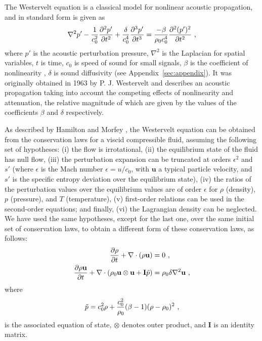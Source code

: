 The Westervelt equation is a classical model for nonlinear acoustic propagation, and in standard form is given as \citep{hamilton1998model}
\begin{align}
  \label{eq:Westervelt}
  \nabla^2 p' 
  - \frac{1}{c_0^2}\frac{\partial ^2 p'}{\partial t^2}
  + \frac{\delta}{c_0^4} \frac{\partial ^3 p'}{\partial t^3} 
  =
  \frac{-\beta}{\rho_0 c_0^4} \frac{\partial ^2 (p')^2}{\partial t^2}
  \ \text{,}
\end{align}
where $p'$ is the acoustic perturbation pressure, $\nabla^2$ is the Laplacian for spatial variables, $t$ is time, $c_0$ is speed of sound for small signals, $\beta$ is the coefficient of nonlinearity \citep{beyer1998parameter}, $\delta$ is sound diffusivity \citep{lighthill} (see Appendix~\ref{sec:appendix}).
It was originally obtained in 1963 by P. J. Westervelt \citep{westervelt} and describes an acoustic propagation taking into account the competing effects of nonlinearity and attenuation, the relative magnitude of which are given by the values of the coefficients $\beta$ and $\delta$ respectively.

As described by Hamilton and Morfey \citep{hamilton1998model}, the Westervelt equation can be obtained from the conservation laws for a viscid compressible fluid, assuming the following set of hypotheses:
(i) the flow is irrotational,
(ii) the equilibrium state of the fluid has null flow, 
(iii) the perturbation expansion can be truncated at orders $\epsilon^2$ and $s'$ (where $\epsilon$ is the Mach number $\epsilon = u/c_0$, with $\mathbf{u}$ a typical particle velocity, and $s'$ is the specific entropy deviation over the equilibrium state),
(iv) the ratios of the perturbation values over the equilibrium values are of order $\epsilon$ for $\rho$ (density), $p$ (pressure), and $T$ (temperature),
(v) first-order relations can be used in the second-order equations; 
and finally, (vi) the Lagrangian density can be neglected. 
We have used the same hypotheses, except for the last one, over the same initial set of conservation laws, to obtain a different form of these conservation laws, as follows:
\begin{subequations}
\label{eq:OurSystem}
\begin{align} 
  \label{eq:mod-prop-fin-mas}
  \frac{\partial \rho}{\partial t} + \nabla \cdot
  \left(\rho \mathbf{u}\right)& = 0 
  \ \text{,} \\ 
  \label{eq:mod-prop-fin-mom}
  \frac{\partial \rho \mathbf{u}}{\partial t} +
  \nabla\cdot\left(
    \rho_0 \mathbf{u}\otimes\mathbf{u} + \mathbf{I}\tilde{p}
  \right)
  &= 
  \rho_0 \delta \nabla^2 \mathbf{u}
  \ \text{,} 
\end{align}
\end{subequations}
where
\begin{align*}
  \tilde{p} = 
  c_0^2 \rho + \frac{c_0^2}{\rho_0} (\beta-1)(\rho-\rho_0)^2 
  \ \text{,}
\end{align*}
is the associated equation of state, $\otimes$ denotes outer product, and $\mathbf{I}$ is an identity matrix.

